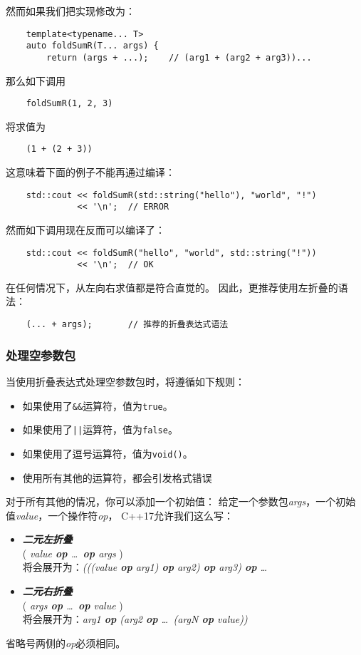 然而如果我们把实现修改为：
\begin{lstlisting}
    template<typename... T>
    auto foldSumR(T... args) {
        return (args + ...);    // (arg1 + (arg2 + arg3))...
\end{lstlisting}
那么如下调用
\begin{lstlisting}
    foldSumR(1, 2, 3)
\end{lstlisting}
将求值为
\begin{lstlisting}
    (1 + (2 + 3))
\end{lstlisting}
这意味着下面的例子不能再通过编译：
\begin{lstlisting}
    std::cout << foldSumR(std::string("hello"), "world", "!")
              << '\n';  // ERROR
\end{lstlisting}
然而如下调用现在反而可以编译了：
\begin{lstlisting}
    std::cout << foldSumR("hello", "world", std::string("!"))
              << '\n';  // OK
\end{lstlisting}
在任何情况下，从左向右求值都是符合直觉的。
因此，更推荐使用左折叠的语法：
\begin{lstlisting}
    (... + args);       // 推荐的折叠表达式语法
\end{lstlisting}

\subsubsection{处理空参数包}\label{ch11.2.1}
当使用折叠表达式处理空参数包时，将遵循如下规则：
\begin{itemize}[leftmargin=*]
    \item 如果使用了\texttt{\&\&}运算符，值为\texttt{true}。
    \item 如果使用了\texttt{||}运算符，值为\texttt{false}。
    \item 如果使用了逗号运算符，值为\texttt{void()}。
    \item 使用所有其他的运算符，都会引发格式错误
\end{itemize}
对于所有其他的情况，你可以添加一个初始值：
给定一个参数包\emph{args}，一个初始值\emph{value}，一个操作符\emph{op}，
C++17允许我们这么写：
\begin{itemize}[leftmargin=*]
    \item \emph{\textbf{二元左折叠}}\\
    ( \emph{value \textbf{op} \ldots \, \textbf{op} args} )\\
    将会展开为：\emph{(((value \textbf{op} arg1) \textbf{op} arg2) \textbf{op} arg3) \textbf{op} \ldots}
    \item \emph{\textbf{二元右折叠}}\\
    ( \emph{args \textbf{op} \ldots \, \textbf{op} value} )\\
    将会展开为：\emph{arg1 \textbf{op} (arg2 \textbf{op} \ldots \, (argN \textbf{op} value))}
\end{itemize}
省略号两侧的\emph{op}必须相同。

